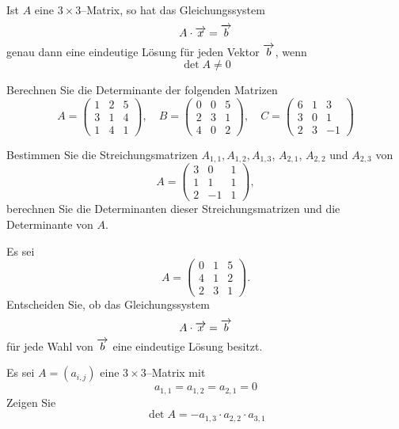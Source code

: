 \begin{satz}\label{det_3_gls_unique}
Ist $A$ eine $3 \times 3$--Matrix, so hat das Gleichungssystem 
  	$$ A \cdot \overrightarrow{x} = \overrightarrow{b} $$
genau dann eine eindeutige Lösung für jeden Vektor $\overrightarrow{b}$, wenn 
  $$ \det{A} \neq 0 $$
\end{satz}

\bigbreak 

\begin{aufgabe} Berechnen Sie die Determinante der folgenden Matrizen
  	$$ A = \left( \begin{matrix} 1 & 2 & 5 \\ 3 & 1 & 4 \\ 1 & 4 & 1 \end{matrix} \right), \quad 
     	B = \left( \begin{matrix} 0 & 0 & 5 \\ 2 & 3 & 1 \\ 4 & 0 & 2 \end{matrix} \right), \quad
     	C = \left( \begin{matrix} 6 & 1 & 3 \\ 3 & 0 & 1 \\ 2 & 3 & -1 \end{matrix} \right) $$
\end{aufgabe}

\begin{aufgabe} Bestimmen Sie die Streichungsmatrizen $A_{1,1}, A_{1,2}, A_{1,3}$, $A_{2,1}$, $A_{2,2}$ und
$A_{2,3}$ von 
  	$$ A = \left( \begin{matrix} 3 & 0 & 1 \\ 1 & 1 & 1 \\ 2 & -1 & 1 \end{matrix} \right), $$
berechnen Sie die Determinanten dieser Streichungsmatrizen und die Determinante von $A$.
\end{aufgabe}

\begin{aufgabe} Es sei 
  	$$  A = \left( \begin{matrix} 0 & 1 & 5 \\ 4 & 1 & 2 \\ 2 & 3 & 1 \end{matrix} \right). $$
Entscheiden Sie, ob das Gleichungssystem 
  	$$ A \cdot \overrightarrow{x} = \overrightarrow{b} $$
für jede Wahl von $\overrightarrow{b}$ eine eindeutige Lösung besitzt.
\end{aufgabe}

\begin{aufgabe} Es sei $A = \left(a_{i,j}\right)$ eine $3 \times 3$--Matrix mit 
  	$$ a_{1,1} = a_{1,2} = a_{2,1} = 0 $$
Zeigen Sie 
  	$$ \det{A} = - a_{1,3} \cdot a_{2,2} \cdot a_{3,1} $$
\end{aufgabe}

